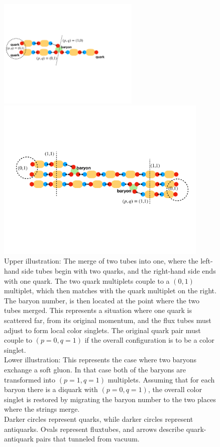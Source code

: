 \documentclass[aps, prc, 12pt, nofootinbib, showpacs, superscriptaddress, tightenlines, groupedaddress]{revtex4-2}
\begin{document}
\begin{figure}
\centerline{\includegraphics[width=0.6\textwidth]{figs/simplemerge.pdf}}
\centerline{\includegraphics[width=0.9\textwidth]{figs/gluonexchange.pdf}}
\caption{\label{fig:merge}
Upper illustration: The merge of two tubes into one, where the left-hand side tubes begin with two quarks, and the right-hand side ends with one quark. The two quark multiplets couple to a $(0,1)$ multiplet, which then matches with the quark multiplet on the right. The baryon number, is then located at the point where the two tubes merged. This represents a situation where one quark is scattered far, from its original momentum, and the flux tubes must adjust to form local color singlets. The original quark pair must couple to $(p=0,q=1)$ if the overall configuration is to be a color singlet.\\
Lower illustration: This represents the case where two baryons exchange a soft gluon. In that case both of the baryons are transformed into $(p=1,q=1)$ multiplets. Assuming that for each baryon there is a diquark with $(p=0,q=1)$, the overall color singlet is restored by migrating the baryon number to the two places where the strings merge.\\
Darker circles represent quarks, while darker circles represent antiquarks. Ovals represent fluxtubes, and arrows describe quark-antiquark pairs that tunneled from vacuum.
}
\end{figure}
\end{document}
